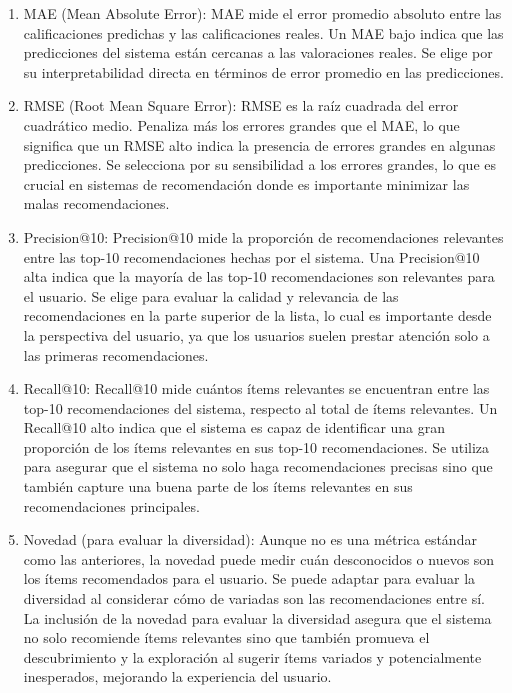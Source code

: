 \documentclass[a4paper,12pt]{report}
\begin{document}
        \begin{enumerate}
            \item MAE (Mean Absolute Error): MAE mide el error promedio absoluto entre las calificaciones predichas y las calificaciones reales. Un MAE bajo indica que las predicciones del sistema están cercanas a las valoraciones reales. Se elige por su interpretabilidad directa en términos de error promedio en las predicciones.
            \item RMSE (Root Mean Square Error): RMSE es la raíz cuadrada del error cuadrático medio. Penaliza más los errores grandes que el MAE, lo que significa que un RMSE alto indica la presencia de errores grandes en algunas predicciones. Se selecciona por su sensibilidad a los errores grandes, lo que es crucial en sistemas de recomendación donde es importante minimizar las malas recomendaciones.
            \item Precision@10: Precision@10 mide la proporción de recomendaciones relevantes entre las top-10 recomendaciones hechas por el sistema. Una Precision@10 alta indica que la mayoría de las top-10 recomendaciones son relevantes para el usuario. Se elige para evaluar la calidad y relevancia de las recomendaciones en la parte superior de la lista, lo cual es importante desde la perspectiva del usuario, ya que los usuarios suelen prestar atención solo a las primeras recomendaciones.
            \item Recall@10: Recall@10 mide cuántos ítems relevantes se encuentran entre las top-10 recomendaciones del sistema, respecto al total de ítems relevantes. Un Recall@10 alto indica que el sistema es capaz de identificar una gran proporción de los ítems relevantes en sus top-10 recomendaciones. Se utiliza para asegurar que el sistema no solo haga recomendaciones precisas sino que también capture una buena parte de los ítems relevantes en sus recomendaciones principales.
            \item Novedad (para evaluar la diversidad): Aunque no es una métrica estándar como las anteriores, la novedad puede medir cuán desconocidos o nuevos son los ítems recomendados para el usuario. Se puede adaptar para evaluar la diversidad al considerar cómo de variadas son las recomendaciones entre sí. La inclusión de la novedad para evaluar la diversidad asegura que el sistema no solo recomiende ítems relevantes sino que también promueva el descubrimiento y la exploración al sugerir ítems variados y potencialmente inesperados, mejorando la experiencia del usuario.
        \end{enumerate}
\end{document}
